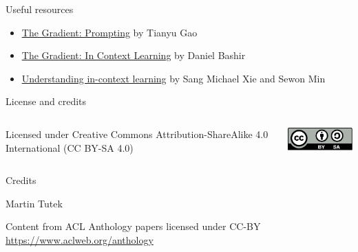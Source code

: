 \documentclass[12pt,aspectratio=169,handout]{beamer}
\begin{document}
\begin{frame}{Useful resources}
	
	\begin{itemize}
		\item \href{https://thegradient.pub/prompting/}{\underline{The Gradient: Prompting}} by Tianyu Gao
		\item \href{https://thegradient.pub/in-context-learning-in-context/}{\underline{The Gradient: In Context Learning}} by Daniel Bashir
		\item \href{http://ai.stanford.edu/blog/understanding-incontext/}{\underline{Understanding in-context learning}} by Sang Michael Xie and Sewon Min
	\end{itemize}
		
	\end{frame}
	


\begin{frame}{License and credits}

	\begin{columns}
		\begin{column}{0.7\textwidth}
			Licensed under Creative Commons Attribution-ShareAlike 4.0 International (CC BY-SA 4.0)
		\end{column}
		\begin{column}{0.2\textwidth}
			\includegraphics[width=0.9\linewidth]{img/cc-by-sa-icon.pdf}
		\end{column}
	\end{columns}
	
	\bigskip
	
	Credits
	
	\begin{scriptsize}
		
		Martin Tutek
		
		Content from ACL Anthology papers licensed under CC-BY \url{https://www.aclweb.org/anthology}
		
	
	\end{scriptsize}
	
\end{frame}
\end{document}
